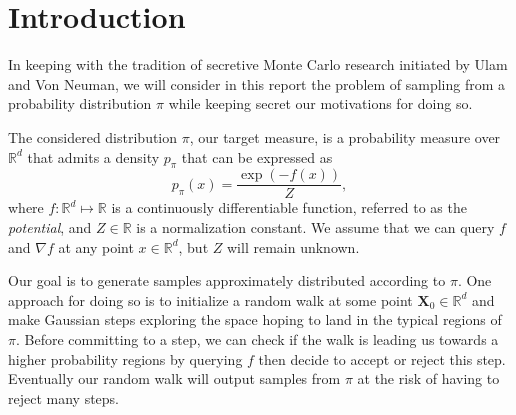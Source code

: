 \documentclass[10pt,journal,a4paper]{IEEEtran}
\theoremstyle{definition}
\newcommand{\R}{\mathbb{R}}
\newcommand{\bX}{\mathbf{X}}
\begin{document}
\IEEEdisplaynotcompsoctitleabstractindextext


%
\IEEEpeerreviewmaketitle


\section{Introduction}

In keeping with the tradition of secretive Monte Carlo research initiated by Ulam and Von Neuman, we will consider in this report the problem of sampling from a probability distribution $\pi$ while keeping secret our motivations for doing so. 

The considered distribution $\pi$, our target measure, is a probability measure over $\R^d$ that admits a density $p_\pi$ that can be expressed as
\[
p_\pi(x) = \frac{\exp{\left(-f(x)\right)}}{Z},
\]
where $f: \R^d \mapsto \R$ is a continuously differentiable function, referred to as the \textit{potential}, and $Z \in \R$ is a normalization constant. We assume that we can query $f$ and $\nabla f$ at any point $x \in \R^d$, but $Z$ will remain unknown.

Our goal is to generate samples approximately distributed according to $\pi$. One approach for doing so is to initialize a random walk at some point $\bX_0 \in \R^d$ and make Gaussian steps exploring the space hoping to land in the typical regions of $\pi$. Before committing to a step, we can check if the walk is leading us towards a higher probability regions by querying $f$ then decide to accept or reject this step. Eventually our random walk will output samples from $\pi$ at the risk of having to reject many steps. 
\end{document}
